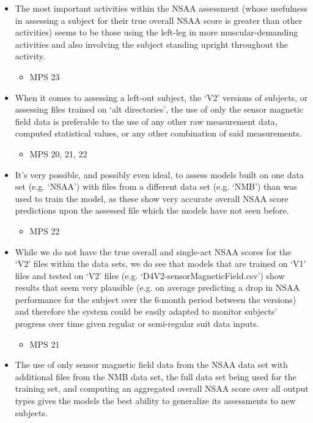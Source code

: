 \documentclass[12pt,twoside]{report}
\begin{document}
\begin{itemize}
	\item The most important activities within the NSAA assessment (whose usefulness in assessing a subject for their true overall NSAA score is greater than other activities) seems to be those using the left-leg in more muscular-demanding activities and also involving the subject standing upright throughout the activity.
	\begin{itemize}
		\item MPS 23
	\end{itemize}
	\item When it comes to assessing a left-out subject, the ‘V2’ versions of subjects, or assessing files trained on ‘alt directories’, the use of only the sensor magnetic field data is preferable to the use of any other raw measurement data, computed statistical values, or any other combination of said measurements.
	\begin{itemize}
		\item MPS 20, 21, 22
	\end{itemize}	
	\item It’s very possible, and possibly even ideal, to assess models built on one data set (e.g. ‘NSAA’) with files from a different data set (e.g. ‘NMB’) than was used to train the model, as these show very accurate overall NSAA score predictions upon the assessed file which the models have not seen before.
	\begin{itemize}
		\item MPS 22
	\end{itemize}
	\item While we do not have the true overall and single-act NSAA scores for the ‘V2’ files within the data sets, we do see that models that are trained on ‘V1’ files and tested on ‘V2’ files (e.g. ‘D4V2-sensorMagneticField.csv’) show results that seem very plausible (e.g. on average predicting a drop in NSAA performance for the subject over the 6-month period between the versions) and therefore the system could be easily adapted to monitor subjects’ progress over time given regular or semi-regular suit data inputs.
	\begin{itemize}
		\item MPS 21
	\end{itemize}
	\item The use of only sensor magnetic field data from the NSAA data set with additional files from the NMB data set, the full data set being used for the training set, and computing an aggregated overall NSAA score over all output types gives the models the best ability to generalize its assessments to new subjects.

\end{itemize}
\end{document}
